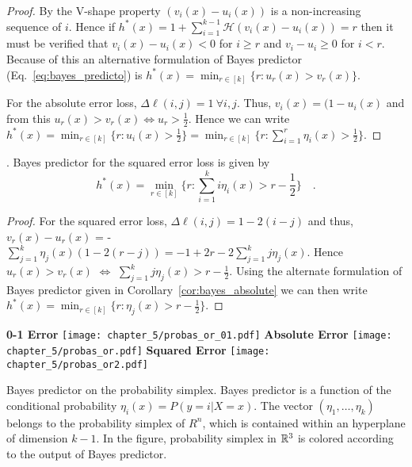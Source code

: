 \begin{proof}
By the V-shape property $(v_i(x) - u_i(x))$ is a non-increasing sequence of $i$. Hence if $h^*(x) = 1 + \sum_{i=1}^{k-1} \mathcal{H}(v_i (x) - u_i(x)) = r$ then it must be verified that $v_i(x) - u_i(x) < 0$ for $i \geq r$ and $v_{i} - u_{i} \geq 0$ for $i < r$. Because of this an alternative formulation of Bayes predictor (Eq.~\ref{eq:bayes_predicto}) is $h^*(x) = \min_{r \in [k]}\{r: u_r(x) > v_r(x)\}$.

For the absolute error loss, $\Delta\ell(i, j) = 1~\forall i, j$. Thus, $v_i(x) = (1 - u_i(x)$ and from this $u_r(x) > v_r(x) \iff u_r > \frac{1}{2}$. Hence we can write $h^*(x)  = \min_{r \in [k]} \{r : u_i(x) > \frac{1}{2}\} = \min_{r \in [k]} \{r : \sum_{i=1}^r \eta_i(x) > \frac{1}{2}\}$.
\end{proof}


\begin{corollary}. Bayes predictor for the squared error loss is given by
\begin{equation}\label{eq:bayes_squared}
h^*(x) = \min_{r \in [k]} \{r : \sum_{i=1}^k i \eta_i(x) > r - \frac{1}{2}\} \quad.
\end{equation}
\end{corollary}

\begin{proof}
For the squared error loss, $\Delta\ell(i, j) = 1 - 2 (i - j)$ and thus, ${v_r(x) - u_r(x)}$ = - $\sum_{j=1}^k \eta_j(x) (1 - 2 (r - j)) =  - 1 + 2 r  - 2 \sum_{j=1}^k j \eta_j(x)$. Hence $u_r(x) > v_r(x)$ $\iff$ $\sum_{j=1}^k j \eta_j(x) > r - \frac{1}{2}$. Using the alternate formulation of Bayes predictor given in Corollary~\ref{cor:bayes_absolute} we can then write $h^*(x) = \min_{r \in [k]} \{r : \eta_j(x) > r - \frac{1}{2}\}$.
\end{proof}

\begin{marginfigure}
\center\textbf{\color{msblue} 0-1 Error}
\texttt{[image: chapter\_5/probas\_or\_01.pdf]}
\vspace{-30pt}\center\textbf{\color{msblue} Absolute Error}
\texttt{[image: chapter\_5/probas\_or.pdf]}
\vspace{-30pt}\center\textbf{\color{msblue} Squared Error}
\texttt{[image: chapter\_5/probas\_or2.pdf]}
\caption{
	Bayes predictor on the probability simplex. Bayes predictor is a function of the conditional probability $\eta_i(x) = P(y\!=i|X\!=\!x)$. The vector $(\eta_1, \ldots, \eta_k)$ belongs to the probability simplex of $R^n$, which is contained within an hyperplane of dimension $k-1$. In the figure, probability simplex in ${\mathbb R}^3$ is colored according to the output of Bayes predictor.
}\label{fig:bayes_predictor}
\end{marginfigure}


